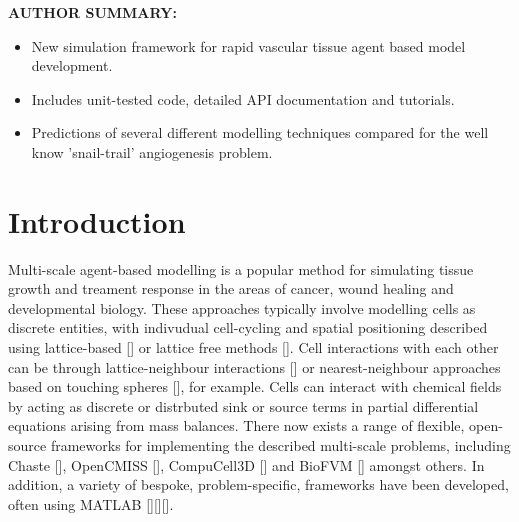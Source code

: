 \documentclass[superscriptaddress, a4paper]{article}
\newenvironment{authorsummary}
{\begin{framed} \begin{center} \begin{minipage}{0.9\textwidth} \noindent}
{\end{minipage} \end{center} \end{framed}}
\begin{document}
\vspace{1.5cm}

\begin{authorsummary}

\textbf{AUTHOR SUMMARY:}

\begin{itemize}
 \item New simulation framework for rapid vascular tissue agent based
 model development.
 \item Includes unit-tested code, detailed API documentation and tutorials.
 \item Predictions of several different modelling techniques compared for the well know 'snail-trail' angiogenesis problem.
\end{itemize}

\end{authorsummary}

\newpage

\setcounter{tocdepth}{3}
\tableofcontents

\newpage
\doublespacing

\section{Introduction}
\label{sec:introduction}

Multi-scale agent-based modelling is a popular method for simulating tissue growth and treament response in the areas of cancer, wound healing and developmental biology. These approaches typically involve modelling cells as discrete entities, with indivudual cell-cycling and spatial positioning described using lattice-based [] or lattice free methods []. Cell interactions with each other can be through lattice-neighbour interactions [] or nearest-neighbour approaches based on touching spheres [], for example. Cells can interact with chemical fields by acting as discrete or distrbuted sink or source terms in partial differential equations arising from mass balances. There now exists a range of flexible, open-source frameworks for implementing the described multi-scale problems, including Chaste [], OpenCMISS [], CompuCell3D [] and BioFVM [] amongst others. In addition, a variety of bespoke, problem-specific, frameworks have been developed, often using MATLAB [][][]. 
\end{document}
